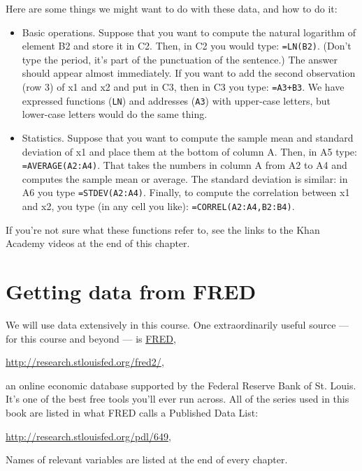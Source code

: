 Here are some things we might want to do with these data,
and how to do it:
\begin{itemize}
\item Basic operations.  Suppose that you want to compute the natural
logarithm of element B2 and store it in C2.
Then, in C2 you would type:  {\tt =LN(B2)}.
(Don't type the period, it's part of the punctuation of the sentence.)
The answer should appear almost immediately.
If you want to add the second observation (row 3) of x1 and x2
and put in C3, then in C3 you type:
{\tt =A3+B3}.
We have expressed functions ({\tt LN}) and addresses ({\tt A3}) with upper-case
letters, but lower-case letters would do the same thing.

\item Statistics.
Suppose that you want to compute the sample mean and standard deviation of
x1 and place them at the bottom of column A.
Then, in A5 type: {\tt =AVERAGE(A2:A4)}.
That takes the numbers in column A from A2 to A4 and computes the sample
mean or average.
The standard deviation is similar:  in A6 you type {\tt =STDEV(A2:A4)}.
Finally, to compute the correlation between x1 and x2,
you type (in any cell you like):
{\tt =CORREL(A2:A4,B2:B4)}.

\end{itemize}
If you're not sure what these functions refer to,
see the links to the Khan Academy videos at the end of this chapter.


\section{Getting data from FRED}

We will use data extensively in this course.
One extraordinarily useful source --- for this course and beyond ---
is \href{http://research.stlouisfed.org/fred2}{FRED},

\vspace*{\parskip}
\centerline{\url{http://research.stlouisfed.org/fred2/},}

an online economic database supported by the Federal Reserve Bank of St. Louis.
It's one of the best free tools you'll ever run across.
All of the series used in this book are listed in what FRED calls
a Published Data List:

\vspace*{\parskip}
\centerline{\url{http://research.stlouisfed.org/pdl/649},}

Names of relevant variables are listed at the end of every chapter.

